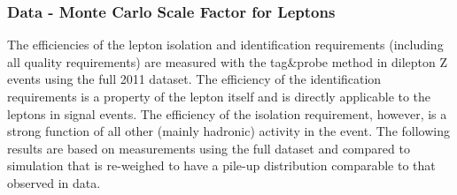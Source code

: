 \subsubsection{Data - Monte Carlo Scale Factor for Leptons}
\label{sec:tnp}

The efficiencies of the lepton isolation and identification requirements (including all quality requirements) 
are measured with the tag\&probe method in dilepton Z events using the full 2011 dataset.
The efficiency of the identification requirements is a property of the lepton itself and is directly applicable
 to the leptons in signal events.
The efficiency of the isolation requirement, however, is a strong function of all other (mainly hadronic)
activity in the event.
The following results are based on measurements using the full dataset and compared 
to simulation that is re-weighed to have a pile-up distribution comparable to that observed in data.

